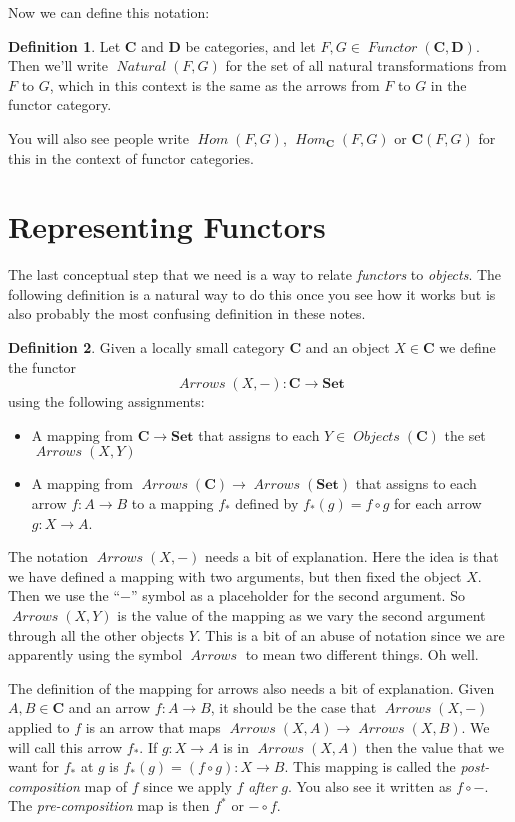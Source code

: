 \documentclass[12pt]{article}
\theoremstyle{definition}
\theoremstyle{definition}
\newtheorem{defn}{Definition}[]
\theoremstyle{definition}
\numberwithin{equation}{section}
\newcommand{\cat}[1]{\mathbf{#1}}      %
\newcommand{\fcat}[1]{{\mathbf {#1}}}    %
\newcommand{\CC}{\cat{C}}
\newcommand{\DD}{\cat{D}}
\DeclareMathOperator{\Arrows}{\mathit{Arrows}}
\DeclareMathOperator{\Objects}{\mathit{Objects}}
\DeclareMathOperator{\Hom}{\mathit{Hom}}
\DeclareMathOperator{\Nat}{\mathit{Natural}}
\DeclareMathOperator{\Fun}{\mathit{Functor}}
\newcommand{\Set}{\fcat{Set}}           %
\def\ni{\goodbreak\noindent}
\begin{document}
Now we can define this notation:

\begin{defn}
Let $\CC$ and $\DD$ be categories, and let $F, G \in \Fun(\CC, \DD)$. Then
we'll write $\Nat(F, G)$ for the set of all natural transformations from $F$ to $G$, which
in this context is the same as the arrows from $F$ to $G$ in the functor category.
\end{defn}
\ni
You will also see people write $\Hom(F, G)$, $\Hom_{\CC}(F,G)$ or $\CC(F, G)$ for this in the context
of functor categories.

\section{Representing Functors}

The last conceptual step that we need is a way to relate {\it functors} to {\it
objects}. The following definition is a natural way to do this once you see how it works
but is also probably the most confusing definition in these notes.

\begin{defn}
Given a locally small category $\CC$ and an object $X \in \CC$ we define the functor
$$
\Arrows(X,-) : \CC \to \Set
$$
using the following assignments:
\begin{itemize}
\item A mapping from $\CC \to \Set$ that assigns to each $Y \in \Objects(\CC)$ the set
$\Arrows(X,Y)$
\item A mapping from $\Arrows(\CC) \to \Arrows(\Set) $ that assigns to each arrow $f: A
\to B$ to a mapping $f_*$ defined by $f_*(g) = f\circ g$ for each arrow $g: X \to A$.
\end{itemize}
\end{defn}

The notation $\Arrows(X,-)$ needs a bit of explanation. Here the idea is that we have defined
a mapping with two arguments, but then fixed the object $X$. 
Then we use the ``$-$'' symbol as a 
placeholder for the second argument. So $\Arrows(X,Y)$ is
the value of the mapping as we vary the second argument through all the other objects $Y$. 
This is a bit of an abuse of notation since we 
are apparently using the symbol $\Arrows$ to mean two different things. Oh well.

The definition of the mapping for arrows also needs a bit of explanation.
Given $A,B \in \CC$ and an arrow $f: A \to B$, it should be the case that $\Arrows(X,-)$ 
applied to $f$ is an arrow that maps $\Arrows(X,A) \to \Arrows(X,B)$.
We will call this arrow $f_*$.  
If $g: X \to A$ is in $\Arrows(X,A)$
then the value 
that we want for $f_*$ at $g$ is $f_*(g) = (f \circ g): X \to B$.
This mapping is called the {\it post-composition} map of $f$ since
we apply $f$ {\it after} $g$.
You also see it written as $f \circ -$.
The {\it pre-composition} map is then $f^*$ or $- \circ f$.
\end{document}

